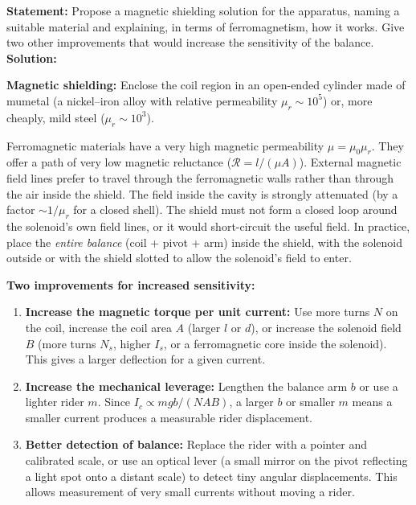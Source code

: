 \documentclass[11pt]{article}
\newcommand{\cle}[1]{{\popxbold\color{popdark}#1}}
\begin{document}
\begin{exoresolu}
\textbf{Statement:} Propose a magnetic shielding solution for the apparatus, naming a suitable material and explaining, in terms of ferromagnetism, how it works. Give two other improvements that would increase the sensitivity of the balance.
\tcblower
\textbf{Solution:}

\textbf{Magnetic shielding:}
Enclose the coil region in an open-ended cylinder made of \cle{mumetal} (a nickel--iron alloy with relative permeability $\mu_r \sim 10^5$) or, more cheaply, \cle{mild steel} ($\mu_r \sim 10^3$). 
\begin{propriete}
Ferromagnetic materials have a very high magnetic permeability $\mu = \mu_0 \mu_r$. They offer a path of very low \cle{magnetic reluctance} ($\mathcal{R} = l/(\mu A)$). External magnetic field lines prefer to travel through the ferromagnetic walls rather than through the air inside the shield. The field inside the cavity is strongly attenuated (by a factor $\sim 1/\mu_r$ for a closed shell). The shield must not form a closed loop around the solenoid's own field lines, or it would short-circuit the useful field. In practice, place the \emph{entire balance} (coil + pivot + arm) inside the shield, with the solenoid outside or with the shield slotted to allow the solenoid's field to enter.
\end{propriete}

\textbf{Two improvements for increased sensitivity:}
\begin{enumerate}
\item \textbf{Increase the magnetic torque per unit current:} Use more turns $N$ on the coil, increase the coil area $A$ (larger $l$ or $d$), or increase the solenoid field $B$ (more turns $N_s$, higher $I_s$, or a ferromagnetic core inside the solenoid). This gives a larger deflection for a given current.
\item \textbf{Increase the mechanical leverage:} Lengthen the balance arm $b$ or use a lighter rider $m$. Since $I_c \propto mgb/(NAB)$, a larger $b$ or smaller $m$ means a smaller current produces a measurable rider displacement.
\item \textbf{Better detection of balance:} Replace the rider with a pointer and calibrated scale, or use an optical lever (a small mirror on the pivot reflecting a light spot onto a distant scale) to detect tiny angular displacements. This allows measurement of very small currents without moving a rider.
\end{enumerate}
\end{exoresolu}
\end{document}
